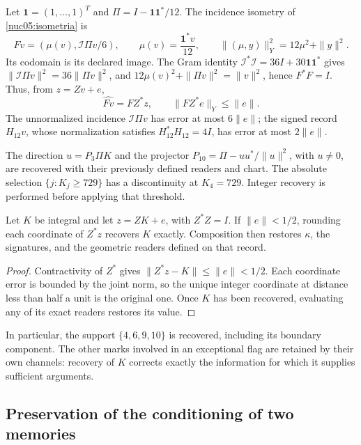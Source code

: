 Let \(\mathbf1=(1,\ldots,1)^T\) and
\(\Pi=I-\mathbf1\mathbf1^*/12\). The incidence isometry of
\cref{nuc05:isometria} is
\begin{equation}
 Fv=(\mu(v),\mathcal I\Pi v/6),\qquad
 \mu(v)=\frac{\mathbf1^*v}{12},\qquad
 \|(\mu,y)\|_Y^2=12\mu^2+\|y\|^2.
 \label{lib04:f-incidencia}
\end{equation}
Its codomain is its declared image. The Gram identity
\(\mathcal I^*\mathcal I=36I+30\mathbf1\mathbf1^*\) gives
\(\|\mathcal I\Pi v\|^2=36\|\Pi v\|^2\), and
\(12\mu(v)^2+\|\Pi v\|^2=\|v\|^2\), hence \(F^*F=I\).
Thus, from \(z=Zv+e\),
\begin{equation}
 \widehat{Fv}=FZ^*z,\qquad \|FZ^*e\|_Y\leq\|e\|.
 \label{lib04:error-incidencia}
\end{equation}
The unnormalized incidence \(\mathcal I\Pi v\) has error at most
\(6\|e\|\); the signed record \(H_{12}v\), whose normalization
satisfies \(H_{12}^*H_{12}=4I\), has error at most
\(2\|e\|\).

The direction \(u=P_3\Pi K\) and the projector
\(P_{10}=\Pi-uu^*/\|u\|^2\), with \(u\neq0\), are recovered
with their previously defined readers and chart. The absolute selection
\(\{j:K_j\geq729\}\) has a discontinuity at \(K_4=729\).
Integer recovery is performed before applying that threshold.

\begin{proposition}
\label{lib04:prop-redondeo}
Let \(K\) be integral and let \(z=ZK+e\), with \(Z^*Z=I\). If
\(\|e\|<1/2\), rounding each coordinate of \(Z^*z\) recovers
\(K\) exactly. Composition then restores \(\kappa\), the signatures,
and the geometric readers defined on that record.
\end{proposition}

\begin{proof}
Contractivity of \(Z^*\) gives
\(\|Z^*z-K\|\leq\|e\|<1/2\). Each coordinate error is
bounded by the joint norm, so the unique integer coordinate at
distance less than half a unit is the original one. Once
\(K\) has been recovered, evaluating any of its exact readers
restores its value.
\end{proof}

In particular, the support \(\{4,6,9,10\}\) is recovered, including
its boundary component. The other marks involved in an exceptional
flag are retained by their own channels: recovery of
\(K\) corrects exactly the information for which it supplies
sufficient arguments.

\subsection{Preservation of the conditioning of two memories}
\label{lib04:dos-memorias}

